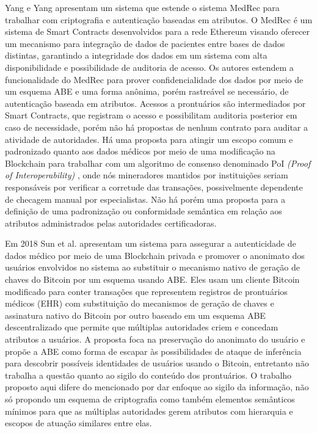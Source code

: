 \documentclass[a4paper,11pt]{article}
\begin{document}
Yang e Yang \cite{Yang2017} apresentam um sistema que estende o sistema MedRec para trabalhar com criptografia e autenticação baseadas em atributos.
O MedRec \cite{Azaria2016} é um sistema de Smart Contracts desenvolvidos para a rede Ethereum visando oferecer um mecanismo para integração de dados de pacientes entre bases de dados distintas, garantindo a integridade dos dados em um sistema com alta disponibilidade e possibilidade de auditoria de acesso.
Os autores estendem a funcionalidade do MedRec para prover confidencialidade dos dados por meio de um esquema ABE e uma forma anônima, porém rastreável se necessário, de autenticação baseada em atributos.
Acessos a prontuários são intermediados por Smart Contracts, que registram o acesso e possibilitam auditoria posterior em caso de necessidade, porém não há propostas de nenhum contrato para auditar a atividade de autoridades.
Há uma proposta para atingir um escopo comum e padronizado quanto aos dados médicos por meio de uma modificação na Blockchain para trabalhar com um algoritmo de consenso denominado PoI \emph{(Proof of Interoperability)} \cite{Azarm-Daigle2015}, onde nós mineradores mantidos por instituições seriam responsáveis por verificar a corretude das transações, possivelmente dependente de checagem manual por especialistas.
Não há porém uma proposta para a definição de uma padronização ou conformidade semântica em relação aos atributos administrados pelas autoridades certificadoras.

Em 2018 Sun et al. \cite{Sun2018} apresentam um sistema para assegurar a autenticidade de dados médico por meio de uma Blockchain privada e promover o anonimato dos usuários envolvidos no sistema ao substituir o mecanismo nativo de geração de chaves do Bitcoin por um esquema usando ABE.
Eles usam um cliente Bitcoin modificado para conter transações que representem registros de prontuários médicos (EHR) com substituição do mecanismos de geração de chaves e assinatura nativo do Bitcoin por outro baseado em um esquema ABE descentralizado que permite que múltiplas autoridades criem e concedam atributos a usuários.
A proposta foca na preservação do anonimato do usuário e propõe a ABE como forma de escapar às possibilidades de ataque de inferência para descobrir possíveis identidades de usuários usando o Bitcoin, entretanto não trabalha a questão quanto ao sigilo do conteúdo dos prontuários.
O trabalho proposto aqui difere do mencionado por dar enfoque ao sigilo da informação, não só propondo um esquema de criptografia como também elementos semânticos mínimos para que as múltiplas autoridades gerem atributos com hierarquia e escopos de atuação similares entre elas.
\end{document}
